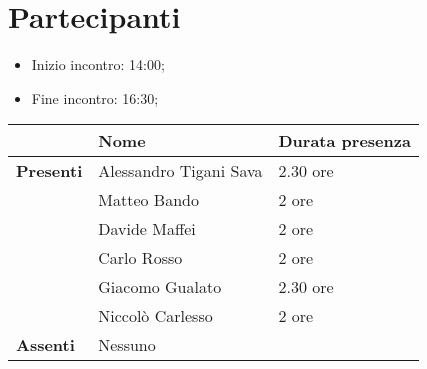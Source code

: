 \section{Partecipanti}

\begin{itemize}
    \item Inizio incontro: 14:00;
    \item Fine incontro: 16:30;
\end{itemize}


\begin{center}
{\renewcommand{\arraystretch}{1.5}
\begin{tabular}{l|ll}
	                    & \textbf{Nome}  & \textbf{Durata presenza} 	\\
	\hline
	\textbf{Presenti}   & Alessandro Tigani Sava            & 2.30 ore     
	\\  & Matteo Bando           & 2 ore     
	\\  & Davide Maffei          & 2 ore     
	\\  & Carlo Rosso            & 2 ore     
	\\  & Giacomo Gualato        & 2.30 ore    
	\\  & Niccolò Carlesso       & 2 ore     \\
	\hline
	\textbf{Assenti}	& 	     Nessuno    &	        \\
\end{tabular}	
}
\end{center}